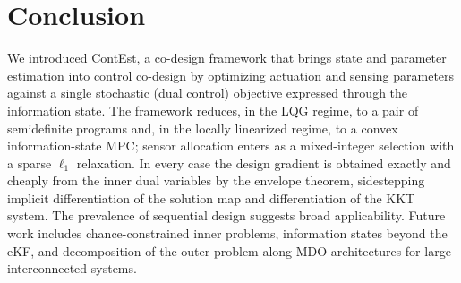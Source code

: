 \documentclass[twocolumn,amsthm]{autart}
\begin{document}
\begin{table}[t]
\centering
\caption{Summary of cost reductions (baseline $\to$ ContEst optimum
$\theta^\star$). $J_{\mathrm{est}}$: estimation cost; $J_{\mathrm{det}}$: control
cost; $J_c=J_{\mathrm{det}}+J_{\mathrm{est}}$;
$J_{\mathrm{tot}}=J_c+J_{\mathrm{des}}$. Percentages are reductions
(larger is better). Baseline is the naive / no-upgrade $\theta_{\mathrm{nom}}$ of
each study (uniform budget for ADCS, naive
default placement for distillation, nominal actuators and PLL for the low-inertia
grid).}
\label{tab:summary}
\end{table}

\section{Conclusion}\label{sec:conclusion}

We introduced ContEst, a co-design framework that brings state and parameter
estimation into control co-design by optimizing actuation and sensing parameters
against a single stochastic (dual control) objective expressed through the
information state. The framework reduces, in the LQG regime, to a pair of
semidefinite programs and, in the locally linearized regime, to a convex
information-state MPC; sensor allocation enters as a mixed-integer selection with
a sparse $\ell_1$ relaxation. In every case the design gradient is obtained
exactly and cheaply from the inner dual variables by the envelope theorem,
sidestepping implicit differentiation of the solution map and differentiation of
the KKT system. The prevalence of sequential design suggests broad
applicability. Future work includes chance-constrained inner problems,
information states beyond the eKF, and decomposition of the outer problem along
MDO architectures for large interconnected systems.
\end{document}
